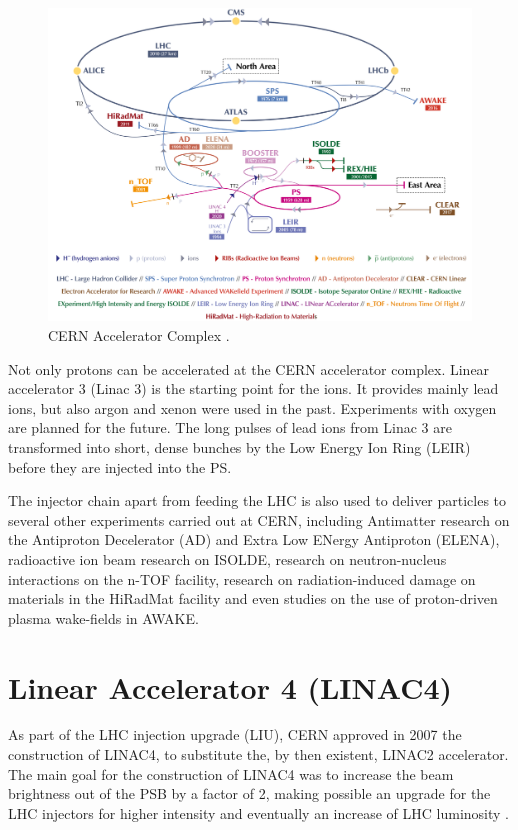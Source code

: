 \begin{figure}[h]
    \centering
    \includegraphics[width=0.95\columnwidth]{Figure_AcceleratorChain/cernComplex.png}
    \caption{CERN Accelerator Complex \parencite*[][]{ref:cerncomplex} . }
    \label{fig:AccComplex}
\end{figure}

Not only protons can be accelerated at the CERN accelerator complex. Linear accelerator 3 (Linac 3) is the starting point for the ions. It provides mainly lead ions, but also argon and xenon were used in the past. Experiments with oxygen are planned for the future. The long pulses of lead ions from Linac 3 are transformed into short, dense bunches by the Low Energy Ion Ring (LEIR) before they are injected into the PS. 

The injector chain apart from feeding the LHC is also used to deliver particles to several other experiments carried out at CERN, including Antimatter research on the Antiproton Decelerator (AD) and Extra Low ENergy Antiproton (ELENA), radioactive ion beam research on ISOLDE, research on neutron-nucleus interactions on the n-TOF facility, research on radiation-induced damage on materials in the HiRadMat facility and even studies on the use of proton-driven plasma wake-fields in AWAKE. 

\section{Linear Accelerator 4 (LINAC4)}
\label{sec:LINAC4}

As part of the LHC injection upgrade (LIU), CERN approved in 2007 the construction of LINAC4, to substitute the, by then existent, LINAC2 accelerator. The main goal for the construction of LINAC4 was to increase the beam brightness out of the PSB by a factor of 2, making possible an upgrade for the LHC injectors for higher intensity and eventually an increase of LHC luminosity \parencite*[]{ref:LIU}. 

